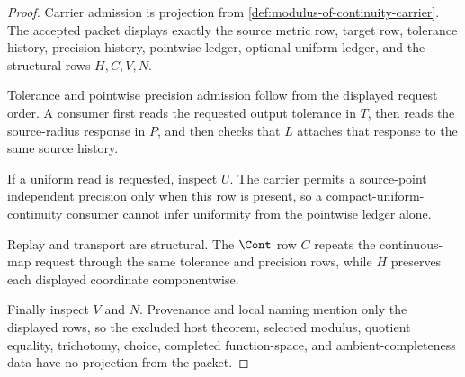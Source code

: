 \begin{proof}
Carrier admission is projection from \autoref{def:modulus-of-continuity-carrier}. The accepted packet displays exactly the source metric row, target row, tolerance history, precision history, pointwise ledger, optional uniform ledger, and the structural rows $H,C,V,N$.

Tolerance and pointwise precision admission follow from the displayed request order. A consumer first reads the requested output tolerance in $T$, then reads the source-radius response in $P$, and then checks that $L$ attaches that response to the same source history.

If a uniform read is requested, inspect $U$. The carrier permits a source-point independent precision only when this row is present, so a compact-uniform-continuity consumer cannot infer uniformity from the pointwise ledger alone.

Replay and transport are structural. The $\Cont$ row $C$ repeats the continuous-map request through the same tolerance and precision rows, while $H$ preserves each displayed coordinate componentwise.

Finally inspect $V$ and $N$. Provenance and local naming mention only the displayed rows, so the excluded host theorem, selected modulus, quotient equality, trichotomy, choice, completed function-space, and ambient-completeness data have no projection from the packet.
\end{proof}

